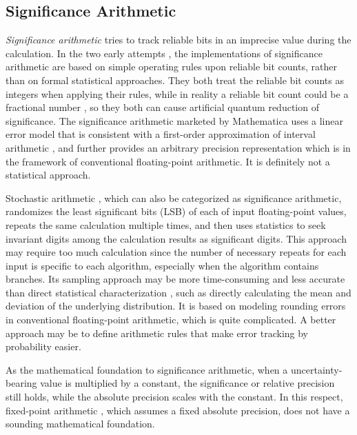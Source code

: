 \documentclass[twoside]{article}
\numberwithin{equation}{section}
\begin{document}
\subsection{Significance Arithmetic}

\emph{Significance arithmetic} \cite{Significance_Arithmetic} tries to track reliable bits in an imprecise value during the calculation.  
In the two early attempts \cite{Digital_Significance_Arithmetic}\cite{Unnormalized_Arithmetic}, the implementations of significance arithmetic are based on simple operating rules upon reliable bit counts, rather than on formal statistical approaches.  
They both treat the reliable bit counts as integers when applying their rules, while in reality a reliable bit count could be a fractional number \cite{Mathematica_Significance_Arithmetic}, so they both can cause artificial quantum reduction of significance.  
The significance arithmetic marketed by Mathematica \cite{Mathematica_Significance_Arithmetic} uses a linear error model that is consistent with a first-order approximation of interval arithmetic \cite{Precise_Numerical_Methods}\cite{Interval_Analysis_Theory_Applications}\cite{Interval_Arithmetic}, and further provides an arbitrary precision representation which is in the framework of  conventional floating-point arithmetic. 
It is definitely not a statistical approach. 

Stochastic arithmetic \cite{Stochastic_Arithmetic}\cite{CADNA_library}, which can also be categorized as significance arithmetic, randomizes the least significant bits (LSB) of each of input floating-point values, repeats the same calculation multiple times, and then uses statistics to seek invariant digits among the calculation results as significant digits.  
This approach may require too much calculation since the number of necessary repeats for each input is specific to each algorithm, especially when the algorithm contains branches.  
Its sampling approach may be more time-consuming and less accurate than direct statistical characterization \cite{Probability_Statistics}, such as directly calculating the mean and deviation of the underlying distribution.  
It is based on modeling rounding errors in conventional floating-point arithmetic, which is quite complicated.  
A better approach may be to define arithmetic rules that make error tracking by probability easier.

As the mathematical foundation to significance arithmetic, when a uncertainty-bearing value is multiplied by a constant, the significance or relative precision still holds, while the absolute precision \cite{Statistical_Methods}\cite{Precisions_Physical_Measurements} scales with the constant.  
In this respect, fixed-point arithmetic \cite{Fixed_Point_Arithmetic}, which assumes a fixed absolute precision, does not have a sounding mathematical foundation.
\end{document}
